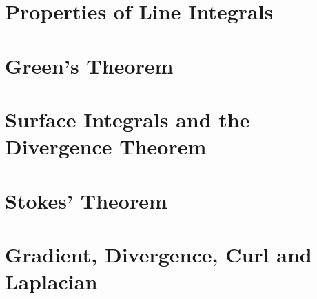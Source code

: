 \documentclass[symmetric,justified,marginals=justified,notoc]{tufte-book}
\theoremstyle{mytheoremstyle}
\begin{document}
	\section{Properties of Line Integrals}
	
	\section{Green's Theorem}
	
	\section{Surface Integrals and the Divergence Theorem}
	
	\section{Stokes' Theorem}
	
	\section{Gradient, Divergence, Curl and Laplacian}
\end{document}
